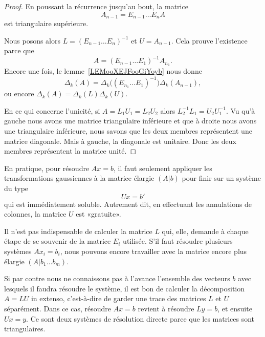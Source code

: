 \begin{proof}
    En poussant la récurrence jusqu'au bout, la matrice
    \begin{equation}
        A_{n-1}=E_{n-1}\ldots E_nA
    \end{equation}
    est triangulaire supérieure.

    Nous posons alors \(   L=(E_{n-1}\ldots E_n)^{-1}  \) et \( U=A_{n-1}\). Cela prouve l'existence parce que
    \begin{equation}
        A=(E_{n-1}\ldots E_1)^{-1}A_{n_1}.
    \end{equation}
    Encore une fois, le lemme~\ref{LEMooXEJFooGiYoyb} nous donne
    \begin{equation}
        \Delta_k(A)=\Delta_k\Big( (E_{n_1}\ldots E_1)^{-1} \Big)\Delta_k(A_{n-1}),
    \end{equation}
    ou encore \( \Delta_k(A)=\Delta_k(L)\Delta_k(U)\).

    En ce qui concerne l'unicité, si \( A=L_1U_1=L_2U_2\) alors \( L_2^{-1}L_1=U_2U_1^{-1} \). Vu qu'à gauche nous avons une matrice triangulaire inférieure et que à droite nous avons une triangulaire inférieure, nous savons que les deux membres représentent une matrice diagonale. Mais à gauche, la diagonale est unitaire. Donc les deux membres représentent la matrice unité.
\end{proof}

\begin{normaltext}
    En pratique, pour résoudre \( Ax=b\), il faut seulement appliquer les transformations gaussiennes à la matrice élargie \( (A|b)\) pour finir sur un système du type
    \begin{equation}
        Ux=b'
    \end{equation}
    qui est immédiatement soluble. Autrement dit, en effectuant les annulations de colonnes, la matrice \( U\) est «gratuite».

    Il n'est pas indispensable de calculer la matrice \( L\) qui, elle, demande à chaque étape de se souvenir de la matrice \( E_i\) utilisée. S'il faut résoudre plusieurs systèmes \( Ax_i=b_i\), nous pouvons encore travailler avec la matrice encore plus élargie \( (A|b_1\ldots b_m)\).

    Si par contre nous ne connaissons pas à l'avance l'ensemble des vecteurs \( b\) avec lesquels il faudra résoudre le système, il est bon de calculer la décomposition \( A=LU \) in extenso, c'est-à-dire de garder une trace des matrices \( L\) et \( U\) séparément. Dans ce cas, résoudre \( Ax=b\) revient à résoudre \( Ly=b\), et ensuite \( Ux=y\). Ce sont deux systèmes de résolution directe parce que les matrices sont triangulaires.
\end{normaltext}

